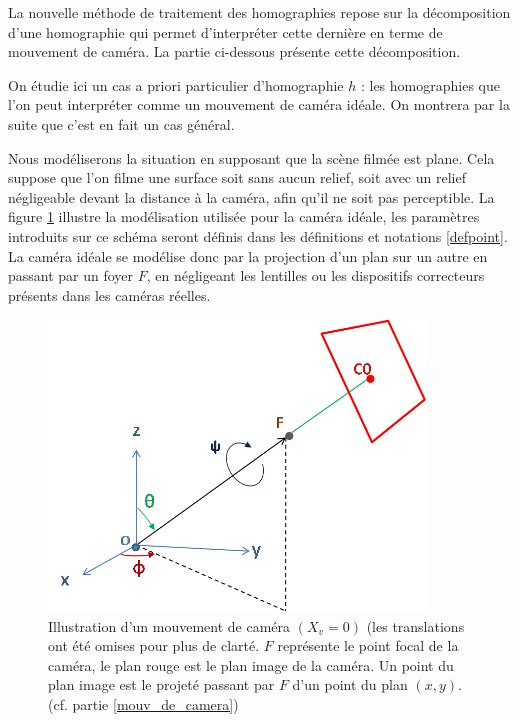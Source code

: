 La nouvelle méthode de traitement des homographies repose sur la décomposition d'une homographie qui permet d'interpréter cette dernière en terme de mouvement de caméra. La partie ci-dessous présente cette décomposition.

\label{mouv_de_camera}
On étudie ici un cas a priori particulier d'homographie $h$ : les homographies que l'on peut interpréter comme un mouvement de caméra idéale. On montrera par la suite que c'est en fait un cas général.

Nous modéliserons la situation en supposant que la scène filmée est plane. Cela suppose que l'on filme une surface soit sans aucun relief, soit avec un relief négligeable devant la distance à la caméra, afin qu'il ne soit pas perceptible. La figure \ref{shmdecomp} illustre la modélisation utilisée pour la caméra idéale, les paramètres introduits sur ce schéma seront définis dans les définitions et notations \ref{defpoint}. La caméra idéale se modélise donc par la projection d'un plan sur un autre en passant par un foyer $F$, en négligeant les lentilles ou les dispositifs correcteurs présents dans les caméras réelles.
\begin{figure}[h!]

\centering
\includegraphics[width=10cm]{shema_decomp.png}
\caption{Illustration d'un mouvement de caméra $(X_v =0)$ (les translations ont été omises pour plus de clarté. $F$ représente le point focal de la caméra, le plan rouge est le plan image de la caméra. Un point du plan image est le projeté passant par $F$ d'un point du plan $(x,y)$. (cf. partie \ref{mouv_de_camera})}
\label{shmdecomp}
\end{figure}

